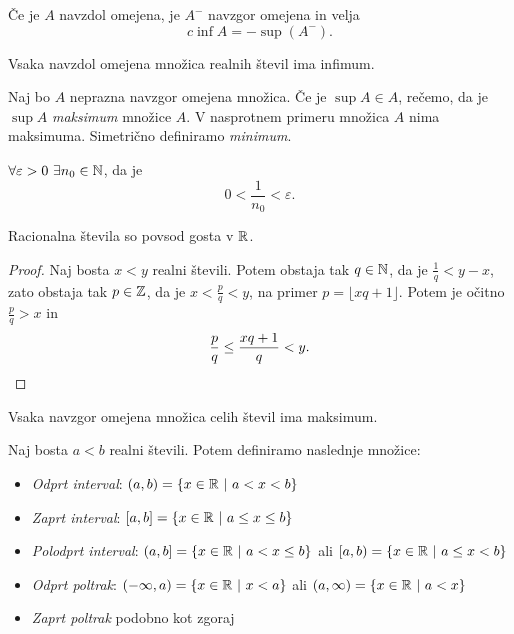 \documentclass[12pt, a4paper]{article}
\begin{document}
\begin{trditev}
Če je $A$ navzdol omejena, je $A^-$ navzgor omejena in velja
\[
c\inf A=-\sup(A^-).
\]
\end{trditev}

\begin{posledica}
Vsaka navzdol omejena množica realnih števil ima infimum.
\end{posledica}

\begin{definicija}
Naj bo $A$ neprazna navzgor omejena množica. Če je $\sup A\in A$, rečemo, da je $\sup A$ \emph{maksimum} množice $A$. V nasprotnem primeru množica $A$ nima maksimuma. Simetrično definiramo \emph{minimum}.
\end{definicija}

\begin{posledica}
$\forall\varepsilon>0~\exists n_0\in\mathbb{N}$, da je
\[
0<\frac{1}{n_0}<\varepsilon.
\]
\end{posledica}

\begin{trditev}
Racionalna števila so povsod gosta v $\mathbb{R}$.
\end{trditev}

\begin{proof}
Naj bosta $x<y$ realni števili. Potem obstaja tak $q\in\mathbb{N}$, da je $\frac{1}{q}<y-x$, zato obstaja tak $p\in\mathbb{Z}$, da je $x<\frac{p}{q}<y$, na primer $p=\lfloor xq+1\rfloor$. Potem je očitno $\frac{p}{q}>x$ in
\[
\frac{p}{q}\leq \frac{xq+1}{q}<y.\qedhere
\]
\end{proof}

\begin{trditev}
Vsaka navzgor omejena množica celih števil ima maksimum.
\end{trditev}

\begin{definicija}
Naj bosta $a<b$ realni števili. Potem definiramo naslednje množice:

\begin{itemize}
\item \emph{Odprt interval}: $(a,b)=\left\{x\in\mathbb{R}~\middle\vert~a<x<b\right\}$
\item \emph{Zaprt interval}: $[a,b]=\left\{x\in\mathbb{R}~\middle\vert~a\leq x\leq b\right\}$
\item \emph{Polodprt interval}: $(a,b]=\left\{x\in\mathbb{R}~\middle\vert~a<x\leq b\right\}$ ali $[a,b)=\left\{x\in\mathbb{R}~\middle\vert~a\leq x<b\right\}$
\item \emph{Odprt poltrak}: $(-\infty, a)=\left\{x\in\mathbb{R}~\middle\vert~x<a\right\}$ ali $(a,\infty)=\left\{x\in\mathbb{R}~\middle\vert~a<x\right\}$
\item \emph{Zaprt poltrak} podobno kot zgoraj
\end{itemize}
\end{definicija}
\end{document}
